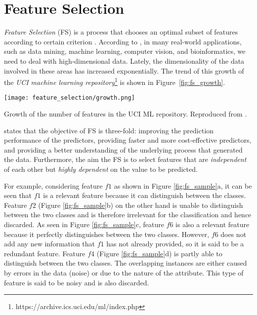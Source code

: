 \chapter{Feature Selection}
\label{ch:feature-selection}

\textit{Feature Selection} (FS) is a process that chooses an optimal subset of features according to certain criterion \citep{liu2012feature}. According to \citet{sammut2017encyclopedia}, in many real-world applications, such as data mining, machine learning, computer vision, and bioinformatics, we need to deal with high-dimensional data. Lately, the dimensionality of the data involved in these areas has increased exponentially. The trend of this growth of the \textit{UCI machine learning repository}\footnote{https://archive.ics.uci.edu/ml/index.php} is shown in Figure~\ref{fig:fs_growth}.

\begin{marginfigure}
  \texttt{[image: feature\_selection/growth.png]}
  \caption{Growth of the number of features in the UCI ML repository. Reproduced from \citet{sammut2017encyclopedia}.}
  \label{fig:fs_growth}
\end{marginfigure}

\citet{guyon2003introduction} states that the objective of FS is three-fold: improving the prediction performance of the predictors, providing faster and more cost-effective predictors, and providing a better understanding of the underlying process that generated the data. Furthermore, the aim the FS is to select features that are \textit{independent} of each other but \textit{highly dependent} on the value to be predicted.

For example, considering feature $f1$ as shown in Figure \ref{fig:fs_sample}a, it can be seen that $f1$ is a relevant feature because it can distinguish between the classes. Feature $f2$ (Figure \ref{fig:fs_sample}b) on the other hand is unable to distinguish between the two classes and is therefore irrelevant for the classification and hence discarded.  As seen in Figure \ref{fig:fs_sample}c, feature $f6$ is also a relevant feature because it perfectly distinguishes between the two classes.  However, $f6$ does not add any new information that $f1$ has not already provided, so it is said to be a redundant feature. Feature $f4$ (Figure \ref{fig:fs_sample}d) is partly able to distinguish between the two classes.  The overlapping instances are either caused by errors in the data (noise) or due to the nature of the attribute.  This type of feature is said to be noisy and is also discarded.

